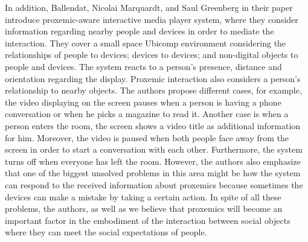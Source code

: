 \par In addition, Ballendat, Nicolai Marquardt, and Saul Greenberg in their paper~\cite{ballendat2010proxemic} introduce proxemic-aware interactive media player system, where they consider information regarding nearby people and devices in order to mediate the interaction. They cover a small space Ubicomp environment considering the relationships of people to devices; devices to devices; and non-digital objects to people and devices. The system reacts to a person’s presence, distance and orientation regarding the display. Proxemic interaction also considers a person’s relationship to nearby objects. The authors propose different cases, for example, the video displaying on the screen pauses when a person is having a phone conversation or when he picks a magazine to read it. Another case is when a person enters the room, the screen shows a video title as additional information for him. Moreover, the video is paused when both people face away from the screen in order to start a conversation with each other. Furthermore, the system turns off when everyone has left the room. However, the authors also emphasize that one of the biggest unsolved problems in this area might be how the system can respond to the received information about proxemics because sometimes the devices can make a mistake by taking a certain action. In spite of all these problems, the authors, as well as we believe that proxemics will become an important factor in the embodiment of the interaction between social objects where they can meet the social expectations of people.

